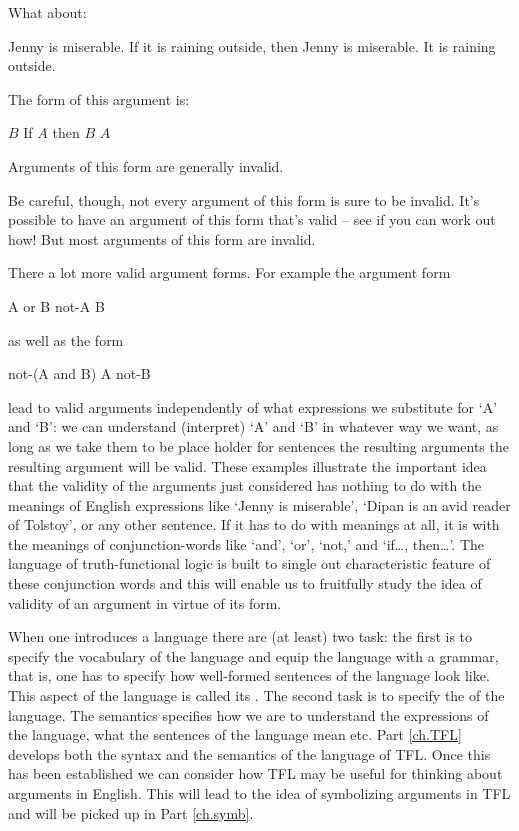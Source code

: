 What about:
	\begin{earg}
		\prem Jenny is miserable.
		\prem If it is raining outside, then Jenny is miserable.
		\conc It is raining outside.
	\end{earg}
The form of this argument is:
\begin{earg}
\prem	$B$
\prem	If $A$ then $B$
\conc $A$
\end{earg}
Arguments of this form are generally invalid.

Be careful, though, not every argument of this form is sure to be invalid.
It’s possible to have an argument of this form that’s valid – see if you can work out how!
But most arguments of this form are invalid.

There a lot more valid argument forms. For example the 
argument form
	\begin{earg}
		\prem A or B
		\prem not-A
		\conc B
	\end{earg}
as well as the form
	\begin{earg}
		\prem not-(A and B)
		\prem A
		\conc not-B
	\end{earg}
lead to valid arguments independently of what expressions we substitute for `A' and `B': we can understand (interpret) `A' and `B' in whatever way we want, as long as we take them to be place holder for sentences the resulting arguments the resulting argument will be valid. These examples illustrate the important idea that the validity of the arguments just considered has nothing to do with the meanings of English expressions like `Jenny is miserable', `Dipan is an avid reader of Tolstoy', or any other sentence. If it has to do with meanings at all, it is with the meanings of conjunction-words like `and', `or', `not,' and `if\ldots, then\ldots'. The language of truth-functional logic is built to single out characteristic feature of these conjunction words and this will enable us to fruitfully study the idea of validity of an argument in virtue of its form.

When one introduces a language there are (at least) two task: the first is to specify the vocabulary of the language and equip the language with a grammar, that is, one has to specify how well-formed sentences of the language look like. This aspect of the language is called its . The second task is to specify the  of the language. The semantics specifies how we are to understand the expressions of the language, what the sentences of the language mean etc. Part \ref{ch.TFL} develops both the syntax and the semantics of the language of TFL. Once this has been established we can consider how TFL may be useful for thinking about arguments in English. This will lead to the idea of symbolizing arguments in TFL and will be picked up in Part \ref{ch.symb}. 

